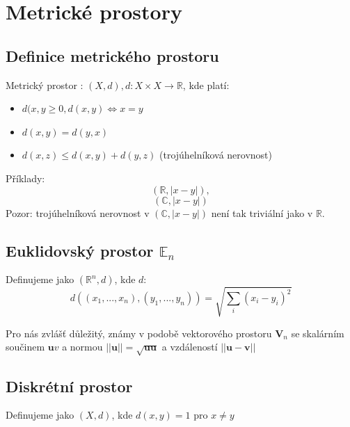 \documentclass[../main.tex]{subfiles}
\begin{document}
\section{Metrické prostory}
\subsection{Definice metrického prostoru}
\large
\hspace{1.2mm}
Metrický prostor : $(X,d), d: X \times X \rightarrow \mathbb{R}$, kde platí:

\begin{itemize}
\item{$d(x,y \geq 0, d(x,y) \iff x = y$ }
\item{$d(x,y) = d(y,x)$}
\item{$d(x,z) \leq d(x,y) + d(y,z)$ (trojúhelníková nerovnost)}
\end{itemize}
\noindent


\hspace{1.2mm}
Příklady: 
\[(\mathbb{R}, |x-y|),\]
\[(\mathbb{C},|x-y|)\]
\hspace{1.2mm}
Pozor: trojúhelníková nerovnost v $(\mathbb{C}, |x-y|)$ není tak triviální jako v $\mathbb{R}$.
\noindent
\subsection{Euklidovský prostor $\mathbb{E}_n$}
\hspace{1.2mm}
Definujeme jako $(\mathbb{R}^n,d)$, kde $d$:
\[d((x_1,...,x_n),(y_1,...,y_n)) = \sqrt{\sum_i(x_i-y_i)^2}\]

Pro nás zvlášť důležitý, známy v podobě vektorového prostoru $\textbf{V}_n$ se skalárním součinem $\textbf{u}v$ a normou
$||\textbf{u}|| = \sqrt{\textbf{uu}}$ a vzdáleností $||\textbf{u}-\textbf{v}||$
\noindent

\subsection{Diskrétní prostor}
\hspace{1.2mm}
Definujeme jako $(X,d)$, kde $d(x,y) = 1$ pro $x \neq y$
\noindent
\end{document}
